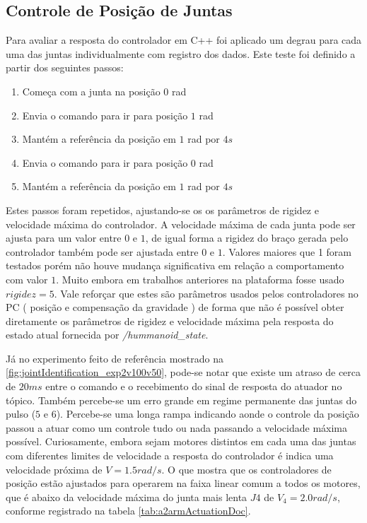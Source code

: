 \subsection{Controle de Posição de Juntas}\label{subsec:stepcpp}

Para avaliar a resposta do controlador em C++ foi aplicado um degrau para cada uma das juntas individualmente com registro dos dados. Este teste foi definido a partir dos seguintes passos:

\begin{enumerate}
    \item Começa com a junta na posição $0$ rad
    \item Envia o comando para ir para posição $1$ rad
    \item Mantém a referência da posição em $1$ rad por $4s$
    \item Envia o comando para ir para posição $0$ rad
    \item Mantém a referência da posição em $1$ rad por $4s$
\end{enumerate}

Estes passos foram repetidos, ajustando-se os os parâmetros de rigidez e velocidade máxima do controlador. A velocidade máxima de cada junta pode ser ajusta para um valor entre $0$ e $1$, de igual forma a rigidez do braço gerada pelo controlador também pode ser ajustada entre $0$ e $1$. Valores maiores que 1 foram testados porém não houve mudança significativa em relação a comportamento com valor $1$. Muito embora em trabalhos anteriores na plataforma fosse usado $rigidez = 5$. Vale reforçar que estes são parâmetros usados pelos controladores no PC ( posição e compensação da gravidade ) de forma que não é possível obter diretamente os parâmetros de rigidez e velocidade máxima pela resposta do estado atual fornecida por \textit{/hummanoid\_state}.

Já no experimento feito de referência mostrado na \ref{fig:jointIdentification_exp2v100v50}, pode-se notar que existe um atraso de cerca de $20ms$ entre o comando e o recebimento do sinal de resposta do atuador no tópico. Também percebe-se um erro grande em regime permanente das juntas do pulso ($5$ e $6$). Percebe-se uma longa rampa indicando aonde o controle da posição passou a atuar como um controle tudo ou nada passando a velocidade máxima possível. Curiosamente, embora sejam motores distintos em cada uma das juntas com diferentes limites de velocidade a resposta do controlador é indica uma velocidade próxima de $V = 1.5 rad/s$. O que mostra que os controladores de posição estão ajustados para operarem na faixa linear comum a todos os motores, que é abaixo da velocidade máxima do junta mais lenta $J4$ de $V_4 = 2.0 rad/s$, conforme registrado na tabela \ref{tab:a2armActuationDoc}.

